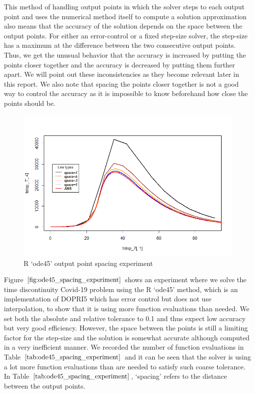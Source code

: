 This method of handling output points in which the solver steps to each output point and uses the numerical method itself to compute a solution approximation also means that the accuracy of the solution depends on the space between the output points. For either an error-control or a fixed step-size solver, the step-size has a maximum at the difference between the two consecutive output points. Thus, we get the unusual behavior that the accuracy is increased by putting the points closer together and the accuracy is decreased by putting them further apart. We will point out these inconsistencies as they become relevant later in this report. We also note that spacing the points closer together is not a good way to control the accuracy as it is impossible to know beforehand how close the points should be.

\begin{figure}[H]
\centering
\includegraphics[width=0.7\linewidth]{./figures/R_ode45_spacing_experiment}
\caption{R `ode45' output point spacing experiment}
\label{fig:ode45_spacing_experiment}
\end{figure}

Figure $\ref{fig:ode45_spacing_experiment}$ shows an experiment where we solve the time discontinuity Covid-19 problem using the R `ode45' method, which is an implementation of DOPRI5 which has error control but does not use interpolation, to show that it is using more function evaluations than needed. We set both the absolute and relative tolerance to 0.1 and thus expect low accuracy but very good efficiency. However, the space between the points is still a limiting factor for the step-size and the solution is somewhat accurate although computed in a very inefficient manner. We recorded the number of function evaluations in Table $\ref{tab:ode45_spacing_experiment}$ and it can be seen that the solver is using a lot more function evaluations than are needed to satisfy such coarse tolerance. In Table $\ref{tab:ode45_spacing_experiment}$, `spacing' refers to the distance between the output points.


